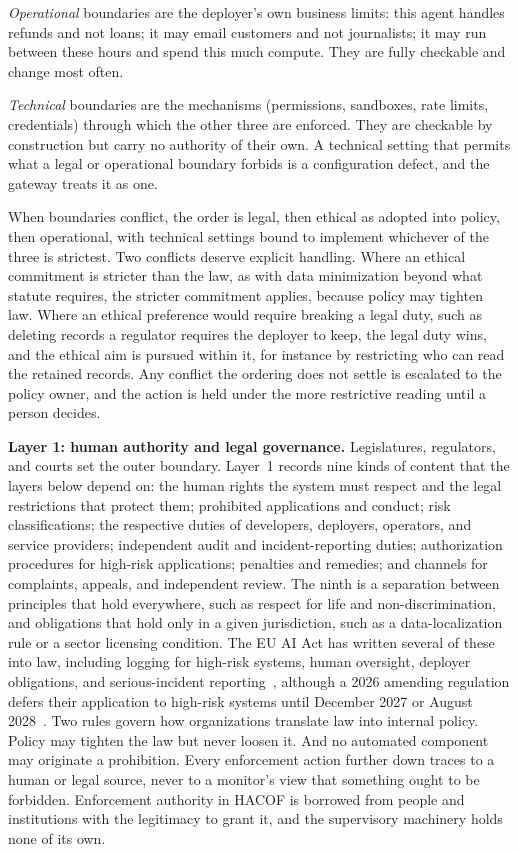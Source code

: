 \documentclass{ieeeaccess}
\newcommand{\hacof}{HACOF}
\begin{document}
\textit{Operational} boundaries are the deployer's own business limits: this agent handles refunds and not loans; it may email customers and not journalists; it may run between these hours and spend this much compute. They are fully checkable and change most often.

\textit{Technical} boundaries are the mechanisms (permissions, sandboxes, rate limits, credentials) through which the other three are enforced. They are checkable by construction but carry no authority of their own. A technical setting that permits what a legal or operational boundary forbids is a configuration defect, and the gateway treats it as one.

When boundaries conflict, the order is legal, then ethical as adopted into policy, then operational, with technical settings bound to implement whichever of the three is strictest. Two conflicts deserve explicit handling. Where an ethical commitment is stricter than the law, as with data minimization beyond what statute requires, the stricter commitment applies, because policy may tighten law. Where an ethical preference would require breaking a legal duty, such as deleting records a regulator requires the deployer to keep, the legal duty wins, and the ethical aim is pursued within it, for instance by restricting who can read the retained records. Any conflict the ordering does not settle is escalated to the policy owner, and the action is held under the more restrictive reading until a person decides.

\textbf{Layer 1: human authority and legal governance.} Legislatures, regulators, and courts set the outer boundary. Layer~1 records nine kinds of content that the layers below depend on: the human rights the system must respect and the legal restrictions that protect them; prohibited applications and conduct; risk classifications; the respective duties of developers, deployers, operators, and service providers; independent audit and incident-reporting duties; authorization procedures for high-risk applications; penalties and remedies; and channels for complaints, appeals, and independent review. The ninth is a separation between principles that hold everywhere, such as respect for life and non-discrimination, and obligations that hold only in a given jurisdiction, such as a data-localization rule or a sector licensing condition. The EU AI Act has written several of these into law, including logging for high-risk systems, human oversight, deployer obligations, and serious-incident reporting~\cite{euaiact2024},
although a 2026 amending regulation defers their application to high-risk systems until December 2027 or August 2028~\cite{euaiomnibus2026}.
Two rules govern how organizations translate law into internal policy. Policy may tighten the law but never loosen it. And no automated component may originate a prohibition. Every enforcement action further down traces to a human or legal source, never to a monitor's view that something ought to be forbidden. Enforcement authority in \hacof{} is borrowed from people and institutions with the legitimacy to grant it, and the supervisory machinery holds none of its own.
\end{document}
